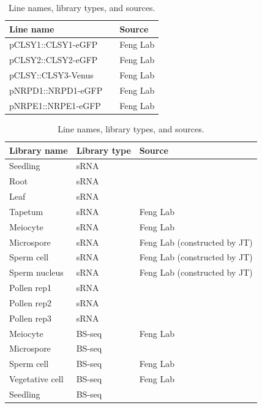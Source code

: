 \begin{table}[htbp]
\centering
\begin{tabular}{|p{5cm}|p{3cm}|p{5cm}|}
\hline
\textbf{Line name} & & \textbf{Source} \\
\hline
pCLSY1::CLSY1-eGFP & & Feng Lab \\
pCLSY2::CLSY2-eGFP & & Feng Lab \\
pCLSY::CLSY3-Venus & &Feng Lab \\
pNRPD1::NRPD1-eGFP & & Feng Lab \\
pNRPE1::NRPE1-eGFP & & Feng Lab \\
\hline
\end{tabular}
\begin{tabular}{|p{5cm}|p{3cm}|p{5cm}|} %
\hline
\textbf{Library name} & \textbf{Library type} & \textbf{Source} \\
\hline
Seedling & sRNA & \cite{RN300} \\
Root & sRNA & \cite{RN301}  \\
Leaf & sRNA & \cite {RN302} \\
Tapetum & sRNA & Feng Lab \\
Meiocyte & sRNA & Feng Lab \\
Microspore & sRNA & Feng Lab (constructed by JT) \\
Sperm cell & sRNA & Feng Lab (constructed by JT) \\
Sperm nucleus & sRNA & Feng Lab (constructed by JT) \\
Pollen rep1 & sRNA & \cite{RN303}  \\
Pollen rep2 & sRNA & \cite{RN304}  \\
Pollen rep3 & sRNA & \cite{RN305}  \\
\hline
Meiocyte & BS-seq & Feng Lab \\
Microspore & BS-seq & \cite{RN306}  \\
Sperm cell & BS-seq & Feng Lab \\
Vegetative cell & BS-seq & Feng Lab \\
Seedling & BS-seq & \cite{RN307}  \\
\hline
\end{tabular}
\caption{Line names, library types, and sources.}
\label{ch2:workbyothers}
\end{table}


